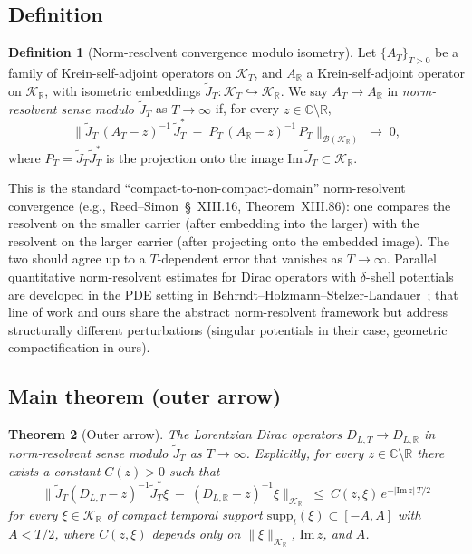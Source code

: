 \documentclass[11pt,a4paper]{article}
\theoremstyle{plain}
\newtheorem{theorem}{Theorem}[section]
\theoremstyle{definition}
\newtheorem{definition}[theorem]{Definition}
\newcommand{\Krein}{\mathcal{K}}
\newcommand{\Bcal}{\mathcal{B}}
\newcommand{\norm}[1]{\lVert #1 \rVert}
\newcommand{\R}{\mathbb{R}}
\newcommand{\C}{\mathbb{C}}
\newcommand{\DLR}{D_{L,\R}}
\newcommand{\DLT}{D_{L,T}}
\newcommand{\JT}{\widetilde{J}_{T}}
\begin{document}
\subsection{Definition}\label{sec:nr_definition}

\begin{definition}[Norm-resolvent convergence modulo isometry]
\label{def:nr_convergence}
Let $\{A_{T}\}_{T > 0}$ be a family of Krein-self-adjoint operators on
$\Krein_{T}$, and $A_{\R}$ a Krein-self-adjoint operator on
$\Krein_{\R}$, with isometric embeddings
$\JT : \Krein_{T} \hookrightarrow \Krein_{\R}$. We say $A_{T} \to
A_{\R}$ in \emph{norm-resolvent sense modulo $\JT$} as $T \to \infty$
if, for every $z \in \C \setminus \R$,
\begin{equation}\label{eq:nr_def}
\bigl\| \JT\,(A_{T} - z)^{-1}\,\JT^{*} \;-\; P_{T}\,(A_{\R} - z)^{-1}\,
P_{T} \bigr\|_{\Bcal(\Krein_{\R})} \;\to\; 0,
\end{equation}
where $P_{T} = \JT \JT^{*}$ is the projection onto the image
$\mathrm{Im}\,\JT \subset \Krein_{\R}$.
\end{definition}

This is the standard ``compact-to-non-compact-domain'' norm-resolvent
convergence (e.g., Reed--Simon~\S~XIII.16, Theorem~XIII.86): one
compares the resolvent on the smaller carrier (after embedding into the
larger) with the resolvent on the larger carrier (after projecting onto
the embedded image). The two should agree up to a $T$-dependent error
that vanishes as $T \to \infty$. Parallel quantitative norm-resolvent
estimates for Dirac operators with $\delta$-shell potentials are
developed in the PDE setting in
Behrndt--Holzmann--Stelzer-Landauer~\cite{behrndt_holzmann_stelzer2026};
that line of work and ours share the abstract norm-resolvent framework
but address structurally different perturbations (singular potentials
in their case, geometric compactification in ours).

\subsection{Main theorem (outer arrow)}\label{sec:outer_main}

\begin{theorem}[Outer arrow]\label{thm:outer}
The Lorentzian Dirac operators $\DLT \to \DLR$ in norm-resolvent sense
modulo $\JT$ as $T \to \infty$. Explicitly, for every
$z \in \C\setminus\R$ there exists a constant $C(z) > 0$ such that
\begin{equation}\label{eq:outer_bound}
\bigl\| \JT (\DLT - z)^{-1} \JT^{*} \xi
\;-\; (\DLR - z)^{-1} \xi \bigr\|_{\Krein_{\R}}
\;\le\; C(z, \xi)\,e^{-|\mathrm{Im}\,z|\,T/2}
\end{equation}
for every $\xi \in \Krein_{\R}$ of compact temporal support
$\mathrm{supp}_{t}(\xi) \subset [-A, A]$ with $A < T/2$, where
$C(z, \xi)$ depends only on $\norm{\xi}_{\Krein_{\R}}$,
$\mathrm{Im}\,z$, and $A$.
\end{theorem}
\end{document}

